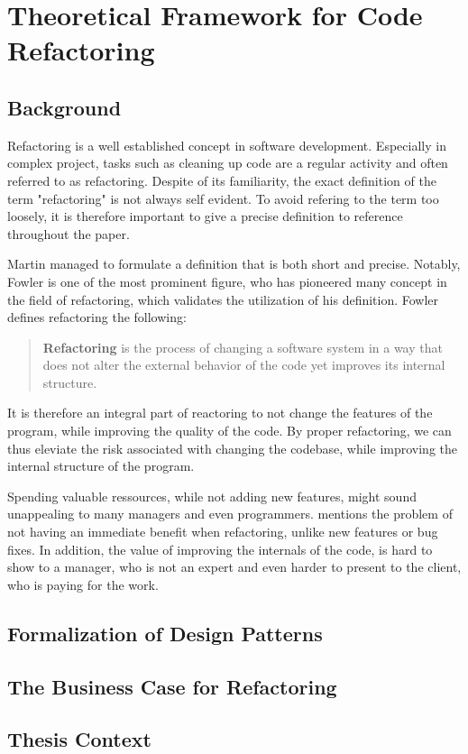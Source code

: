 \chapter{Theoretical Framework for Code Refactoring}

\section{Background}



Refactoring is a well established concept in software development. 
Especially in complex project, 
	tasks such as cleaning up code are a regular activity and often referred to as refactoring. 
Despite of its familiarity, 
	the exact definition of the term "refactoring" is not always self evident.
To avoid refering to the term too loosely, 
	it is therefore important to give a precise definition to reference throughout the paper. 

Martin \textcite{fowler2018} managed to formulate a definition that is both short and precise. 
Notably, Fowler is one of the most prominent figure, 
	who has pioneered many concept in the field of refactoring,
	which validates the utilization of his definition.
Fowler defines refactoring the following:
\begin{quote}
\textbf{Refactoring} is the process of changing a software system in a way 
	that does not alter the external behavior of the code yet improves its internal structure.
\end{quote}

It is therefore an integral part of reactoring to not change the features of the program, 
	while improving the quality of the code.
By proper refactoring, we can thus eleviate the risk associated with changing the codebase,
	while improving the internal structure of the program.


Spending valuable ressources, while not adding new features, 
	might sound unappealing to many managers and even programmers.
\textcite{kim2021} mentions the problem of not having an immediate benefit when refactoring, 
	unlike new features or bug fixes.
In addition, the value of improving the internals of the code, is hard to show to a manager, 
	who is not an expert and even harder to present to the client, who is paying for the work.



\section{Formalization of Design Patterns}
\section{The Business Case for Refactoring}
\section{Thesis Context}
